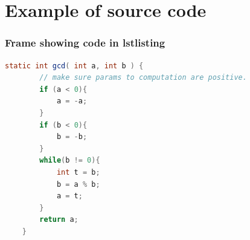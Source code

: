 \documentclass[aspectratio=169]{beamer}
\begin{document}
\section{Example of source code}
\begin{frame}[containsverbatim]
    \frametitle{Frame showing code in lstlisting}

    \begin{lstlisting}[language=Java, caption={Code example for GCD},captionpos=b]
    static int gcd( int a, int b ) {
        // make sure params to computation are positive.
        if (a < 0){
            a = -a;
        }
        if (b < 0){
            b = -b;
        }
        while(b != 0){
            int t = b;
            b = a % b;
            a = t;
        }
        return a;
    }
    \end{lstlisting}

\end{frame}
\end{document}
